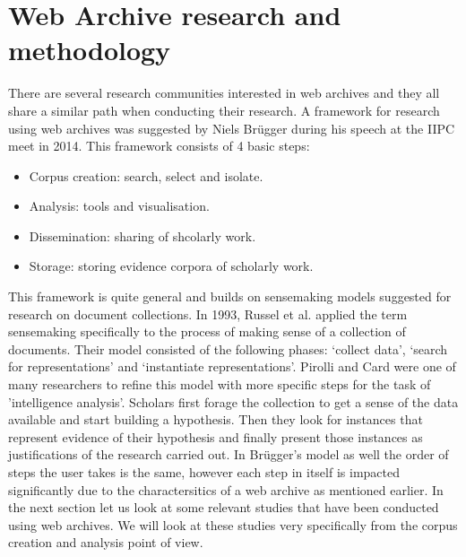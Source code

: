
\section{Web Archive research and methodology} %
\label{sec:types_of_web_archive_research}

There are several research communities interested in web archives and they all share a similar path when conducting their research. A framework for research using web archives was suggested by Niels Br\"ugger during his speech at the IIPC meet in 2014. This framework consists of 4 basic steps:

\begin{itemize}
	\item Corpus creation: search, select and isolate.
	\item Analysis: tools and visualisation.
	\item Dissemination: sharing of shcolarly work.
	\item Storage: storing evidence corpora of scholarly work.
\end{itemize}


This framework is quite general and builds on sensemaking models suggested for research on document collections. In 1993, Russel et al. \cite{russell1993cost} applied the term sensemaking specifically to the process of making sense of a collection of documents. Their model consisted of the following phases: ‘collect data’, ‘search for representations’ and ‘instantiate representations’. Pirolli and Card were one of many researchers to refine this model with more specific steps for the task of 'intelligence analysis'\cite{pirolli2005sensemaking}. Scholars first forage the collection to get a sense of the data available and start building a hypothesis. Then they look for instances that represent evidence of their hypothesis and finally present those instances as justifications of the research carried out. In Br\"ugger's model as well the order of steps the user takes is the same, however each step in itself is impacted significantly due to the charactersitics of a web archive as mentioned earlier. In the next section let us look at some relevant studies that have been conducted using web archives. We will look at these studies very specifically from the corpus creation and analysis point of view.

